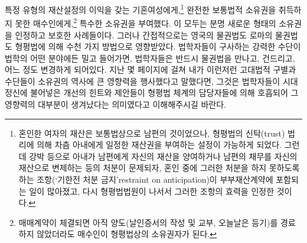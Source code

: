 특정 유형의 재산설정의 이익을 갖는 기혼여성에게,\footnote{%
  혼인한 여자의 재산은 보통법상으로 남편의 것이었으나,
  형평법의 신탁(trust) 법리에 의해
  차츰 아내에게 일정한 재산권을 부여하는 설정이 가능하게 되었다.
  그런데 강박 등으로 아내가 남편에게 자신의 재산을 양여하거나
  남편의 채무를 자신의 재산으로 변제하는 등의 처분이 문제되자,
  혼인 중에 그러한 처분을 하지 못하도록 하는
  조항(`기한전 처분 금지'restraint on anticipation)이
  부부재산계약에 포함되는 일이 많아졌고, 다시
  형평법법원이 나서서 그러한 조항의 효력을 인정한 것이다.
  }
완전한 보통법적 소유권을 취득하지 못한 매수인에게,\footnote{%
  매매계약이 체결되면
  아직 양도(날인증서의 작성 및 교부, 오늘날은 등기)를 경료하지 않았더라도
  매수인이 형평법상의 소유권자가 된다. }
특수한 소유권을 부여했다.
이 모두는 분명 새로운 형태의 소유권을 인정하고 보호한 사례들이다.
그러나
간접적으로는
영국의 물권법도 로마의 물권법도
형평법에 의해 수천 가지 방법으로 영향받았다.
법학자들이 구사하는 강력한 수단이
법학의 어떤 분야에든
밀고 들어가면,
법학자들은
반드시
물권법을 만나고, 건드리고, 어느 정도 변경하게 되어있다.
지난 몇 페이지에 걸쳐
내가
이런저런 고대법적 구별과 수단들이
소유권의 역사에 큰 영향력을 행사했다고
말했다면,
그것은
법학자들이
시대정신에
불어넣은 개선의 힌트와 제안들이
형평법 체계의 담당자들에 의해 호흡되어
그 영향력의 대부분이 생겨났다는
의미였다고 이해해주시길 바란다.

